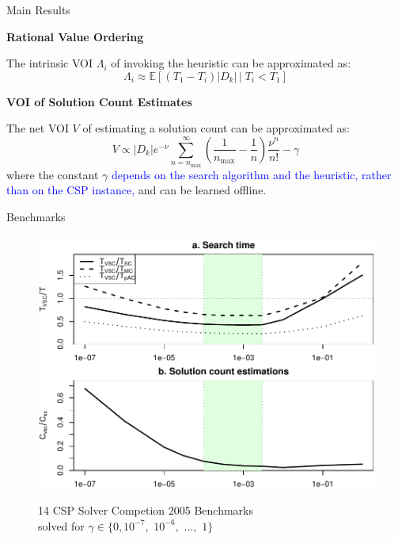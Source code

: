 \documentclass{beamer}
\begin{document}
\begin{frame}{Main Results}

{\large{\bf Rational Value Ordering}}

The intrinsic VOI $\Lambda_i$ of invoking the heuristic can be approximated as:
\[\Lambda_i\approx \mathbb{E}\left[(T_1-T_i)|D_k|\,\Big|\; T_i < T_1 \right]\]

{\large{\bf VOI of Solution Count Estimates}}

The net VOI $V$ of estimating a solution count can be approximated as:
\[V \propto |D_k|e^{-\nu}\sum_{n=n_\mathrm{max}}^\infty \! \! \left( \frac 1 {n_\mathrm{max}} - \frac 1 n\right) \frac {\nu^n} {n!}-\gamma\]
where the constant $\gamma$ \textcolor{blue}{depends on the search algorithm and the heuristic, rather than on the CSP instance,} and can be learned offline. 
\end{frame}

\begin{frame}{Benchmarks}
\vspace{-24pt}
\begin{figure}[h]
\centering
\includegraphics[scale=0.6]{benchmarks.pdf}

14 CSP Solver Competion 2005 Benchmarks\\
solved for $\gamma \in \{0, 10^{-7},$ $10^{-6},$ $...,$ $1\}$
\end{figure}
\end{frame}
\end{document}
